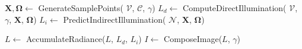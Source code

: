 \begin{algorithm}
    \caption{Neural render}
    \label{alg:nr}
    \DontPrintSemicolon
    \BlankLine

    $\mathbf{X}, \boldsymbol\Omega \leftarrow$ GenerateSamplePoints(%
        $\mathcal{V}$, $\mathcal{C}$, $\gamma$)\;
    $L_d \leftarrow$ ComputeDirectIllumination(%
        $\mathcal{V}$, $\gamma$, $\mathbf{X}$, $\boldsymbol\Omega$)\;
    $L_i \leftarrow$ PredictIndirectIllumination(%
        $\mathcal{N}$, $\mathbf{X}$, $\boldsymbol\Omega$)\;
    \BlankLine
    
    \BlankLine

    $L \leftarrow$ AccumulateRadiance($L$, $L_d$, $L_i$)\;
    $I \leftarrow$ ComposeImage($L$, $\gamma$)\;
    \BlankLine
    
\end{algorithm}
